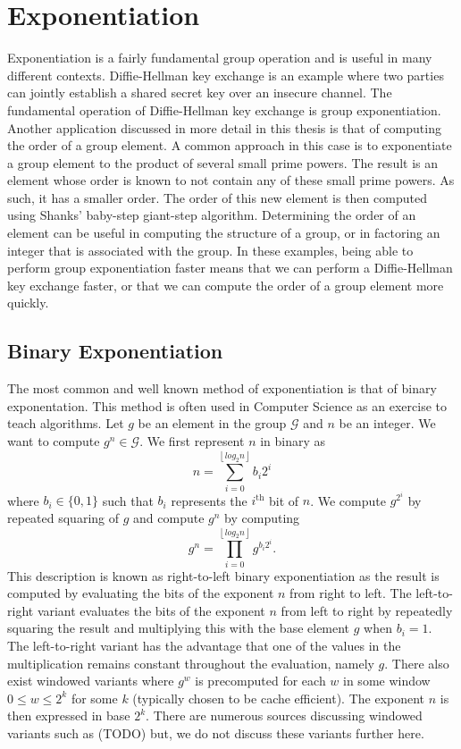 \documentclass{ucalgthes1}
\theoremstyle{plain}
\theoremstyle{definition}
\newcommand{\floor}[1]{\left\lfloor #1 \right\rfloor}
\begin{document}
\setcounter{chapter}{2}
\chapter{Exponentiation}

Exponentiation is a fairly fundamental group operation and is useful in many different contexts.  Diffie-Hellman key exchange is an example where two parties can jointly establish a shared secret key over an insecure channel.  
 The fundamental operation of Diffie-Hellman key exchange is group exponentiation. Another application discussed in more detail in this thesis is that of computing the order of a group element.  A common approach in this case is to exponentiate a group element to the product of several small prime powers.  The result is an element whose order is known to not contain any of these small prime powers.  As such, it has a smaller order.  The order of this new element is then computed using Shanks' baby-step giant-step algorithm.  Determining the order of an element can be useful in computing the structure of a group, or in factoring an integer that is associated with the group.  In these examples, being able to perform group exponentiation faster means that we can perform a Diffie-Hellman key exchange faster, or that we can compute the order of a group element more quickly.


\bigbreak
\section{Binary Exponentiation}
The most common and well known method of exponentiation is that of binary exponentation.  This method is often used in Computer Science as an exercise to teach algorithms.  Let $g$ be an element in the group $\mathcal G$ and $n$ be an integer.  We want to compute $g^n \in \mathcal G$.  We first represent $n$ in binary as
\[
	n = \sum_{i=0}^{\floor{log_2 n}} b_i 2^i
\]
where $b_i \in \{0, 1\}$ such that $b_i$ represents the $i^{\textrm{th}}$ bit of $n$.   We compute $g^{2^i}$ by repeated squaring of $g$ and compute $g^n$ by computing
\[
	g^n = \prod_{i=0}^{\floor{log_2 n}} g^{b_i 2^i}.
\]
This description is known as right-to-left binary exponentiation as the result is computed by evaluating the bits of the exponent $n$ from right to left.  The left-to-right variant evaluates the bits of the exponent $n$ from left to right by repeatedly squaring the result and multiplying this with the base element $g$ when $b_i = 1$.  The left-to-right variant has the advantage that one of the values in the multiplication remains constant throughout the evaluation, namely $g$.  There also exist windowed variants where $g^w$ is precomputed for each $w$ in some window $0 \le w \le 2^k$ for some $k$ (typically chosen to be cache efficient). The exponent $n$ is then expressed in base $2^k$.  There are numerous sources discussing windowed variants such as (TODO) but, we do not discuss these variants further here.
\end{document}
